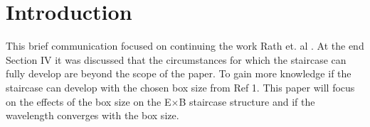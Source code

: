 \documentclass[aip, amsmath, amssymb, reprint, twocolumn]{revtex4-1}
\begin{document}









\section{Introduction}
\label{sec:intro}

This brief communication focused on continuing the work Rath et. al \cite{doi:10.1063/1.4961231}. At the end Section IV it was 
discussed that the circumstances for which the staircase can fully develop are beyond the scope of the paper. To gain more
knowledge if the staircase can develop with the chosen box size from Ref 1.
This paper will focus on the effects of the box size on the E$\times$B staircase structure and if the wavelength converges with the box size. 
\end{document}

